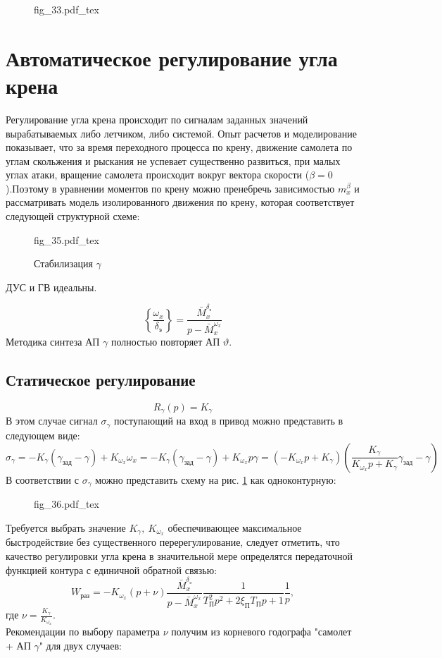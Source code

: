 \documentclass{article}
\begin{document}
\begin{figure}[H]
    \centering
    {fig_33.pdf_tex}
\end{figure}

\section{Автоматическое регулирование угла крена}
Регулирование угла крена происходит по сигналам заданных значений
вырабатываемых либо летчиком, либо системой. Опыт расчетов и моделирование
показывает, что за время переходного процесса по крену, движение самолета по
углам скольжения и рыскания не успевает существенно развиться, при малых углах
атаки, вращение самолета происходит вокруг вектора скорости ($\beta =
0$).Поэтому в уравнении моментов по крену можно пренебречь зависимостью
$m_x^\beta$ и рассматривать модель изолированного движения по крену, которая
соответствует следующей структурной схеме:

\begin{figure}[H]
    \centering
    {fig_35.pdf_tex}
    \caption{Стабилизация $\gamma$}
    \label{fig:stab_gamma}
\end{figure}
ДУС и ГВ идеальны.

\[
    \left\{\frac{\omega_x}{\delta_\text{э}} \right\}
    =\frac{\bar{M}_x^{\delta_\text{э}}}{ p - \bar{M}_x^{\omega_x}}
\]
Методика синтеза АП $\gamma$ полностью повторяет АП $\vartheta$.

\subsection{Статическое регулирование}
\[
    R_\gamma(p) = K_\gamma
\]
В этом случае сигнал $\sigma_\gamma$ поступающий на вход в привод можно
представить в следующем виде:
\[
    \sigma_\gamma =  - K_\gamma(\gamma_\text{зад} - \gamma) + K_{\omega_x}
    \omega_x = - K_{\gamma} (\gamma_\text{зад} - \gamma) + K_{\omega_x} p
    \gamma = (-K_{\omega_x} p + K_\gamma) \left(\frac{K_\gamma}{K_{\omega_x}p +
    K_\gamma} \gamma_\text{зад} - \gamma \right)
\]
В соответствии с $\sigma_\gamma$ можно представить схему на рис.
\ref{fig:stab_gamma} как одноконтурную:
\begin{figure}[H]
    \centering
    {fig_36.pdf_tex}
\end{figure}

Требуется выбрать значение $K_\gamma, \ K_{\omega_x}$ обеспечивающее
максимальное быстродействие без существенного перерегулирование, следует
отметить, что качество регулировки угла крена в значительной мере определятся
передаточной функцией контура с единичной обратной связью:
\[
    W_\text{раз} = -K_{\omega_x} (p + \nu)\frac{\bar{M}_x^{\delta_\text{э}}}{p
    -\bar{M}_x^{\omega_x}}\frac{1}{T_\text{П}^2 p^2 + 2 \xi_\text{П} T_\text{П}
p + 1}\frac{1}{p},
\]
где $\nu = \frac{K_\gamma}{K_{\omega_x}}$.\\
Рекомендации по выбору параметра $\nu$ получим из корневого годографа "самолет
+ АП $\gamma$" для двух случаев:
\end{document}

